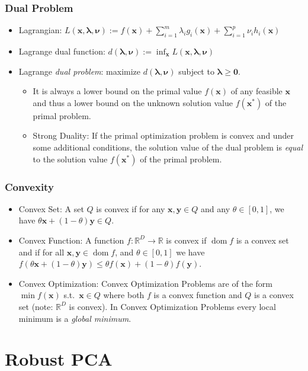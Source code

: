 \documentclass[11pt,a4paper,technote]{IEEEtran}
\newcommand{\vect}[1]{\boldsymbol{\mathbf{#1}}}
\DeclareMathOperator{\dom}{dom}
\newcommand{\from}{\colon}
\newcommand{\R}{\mathbb{R}}
\begin{document}
\subsubsection*{Dual Problem}
\begin{itemize}
  \item Lagrangian: $L(\vect{x},\vect{\lambda},\vect{\nu}) := f(\vect{x}) +
    \sum_{i=1}^m \lambda_i g_i(\vect{x}) + \sum_{i=1}^p \nu_i h_i(\vect{x})$
  \item Lagrange dual function: $d(\vect{\lambda},\vect{\nu}) := \inf_{\vect{x}}
    L(\vect{x},\vect{\lambda},\vect{\nu})$
  \item Lagrange \emph{dual problem}: maximize $d(\vect{\lambda},\vect{\nu})$
    subject to $\vect{\lambda} \geq \vect{0}$.
    \begin{itemize}
      \item It is always a lower bound on the primal value $f(\vect{x})$ of any
        feasible $\vect{x}$ and thus a lower bound on the unknown solution value
        $f(\vect{x}^*)$ of the primal problem.
      \item Strong Duality: If the primal optimization problem is convex and
        under some additional conditions, the solution value of the dual
        problem is \emph{equal} to the solution value $f(\vect{x}^*)$ of the
        primal problem.
    \end{itemize}
\end{itemize}

\subsubsection*{Convexity}
\begin{itemize}
  \item Convex Set: A set $Q$ is convex if for any $\vect{x},\vect{y} \in Q$
    and any $\theta \in [0,1]$, we have $\theta\vect{x} + (1-\theta) \vect{y}
    \in Q$.
  \item Convex Function: A function $f\from\R^D\to\R$ is convex if $\dom f$ is
    a convex set and if for all $\vect{x},\vect{y}\in\dom f$, and $\theta\in
    [0,1]$ we have $f(\theta\vect{x} + (1-\theta)\vect{y}) \leq \theta
    f(\vect{x}) + (1-\theta)f(\vect{y})$.
  \item Convex Optimization: Convex Optimization Problems are of the form $\min
    f(\vect{x})$ s.t.\ $\vect{x}\in Q$ where both $f$ is a convex function and
    $Q$ is a convex set (note: $\R^D$ is convex). In Convex Optimization
    Problems every local minimum is a \emph{global minimum}.

\end{itemize}

\section*{Robust PCA}
\end{document}
